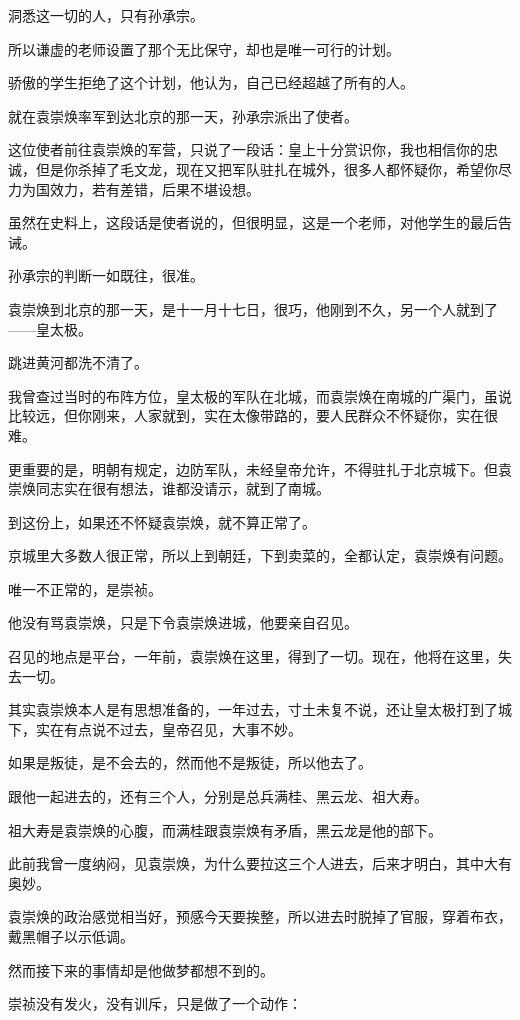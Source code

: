\begin{multicols}{\theparacolNo}
洞悉这一切的人，只有孙承宗。

所以谦虚的老师设置了那个无比保守，却也是唯一可行的计划。

骄傲的学生拒绝了这个计划，他认为，自己已经超越了所有的人。

就在袁崇焕率军到达北京的那一天，孙承宗派出了使者。

这位使者前往袁崇焕的军营，只说了一段话：皇上十分赏识你，我也相信你的忠诚，但是你杀掉了毛文龙，现在又把军队驻扎在城外，很多人都怀疑你，希望你尽力为国效力，若有差错，后果不堪设想。

虽然在史料上，这段话是使者说的，但很明显，这是一个老师，对他学生的最后告诫。

孙承宗的判断一如既往，很准。

袁崇焕到北京的那一天，是十一月十七日，很巧，他刚到不久，另一个人就到了——皇太极。

跳进黄河都洗不清了。

我曾查过当时的布阵方位，皇太极的军队在北城，而袁崇焕在南城的广渠门，虽说比较远，但你刚来，人家就到，实在太像带路的，要人民群众不怀疑你，实在很难。

更重要的是，明朝有规定，边防军队，未经皇帝允许，不得驻扎于北京城下。但袁崇焕同志实在很有想法，谁都没请示，就到了南城。

到这份上，如果还不怀疑袁崇焕，就不算正常了。

京城里大多数人很正常，所以上到朝廷，下到卖菜的，全都认定，袁崇焕有问题。

唯一不正常的，是崇祯。

他没有骂袁崇焕，只是下令袁崇焕进城，他要亲自召见。

召见的地点是平台，一年前，袁崇焕在这里，得到了一切。现在，他将在这里，失去一切。

其实袁崇焕本人是有思想准备的，一年过去，寸土未复不说，还让皇太极打到了城下，实在有点说不过去，皇帝召见，大事不妙。

如果是叛徒，是不会去的，然而他不是叛徒，所以他去了。

跟他一起进去的，还有三个人，分别是总兵满桂、黑云龙、祖大寿。

祖大寿是袁崇焕的心腹，而满桂跟袁崇焕有矛盾，黑云龙是他的部下。

此前我曾一度纳闷，见袁崇焕，为什么要拉这三个人进去，后来才明白，其中大有奥妙。

袁崇焕的政治感觉相当好，预感今天要挨整，所以进去时脱掉了官服，穿着布衣，戴黑帽子以示低调。

然而接下来的事情却是他做梦都想不到的。

崇祯没有发火，没有训斥，只是做了一个动作：


\end{multicols}
